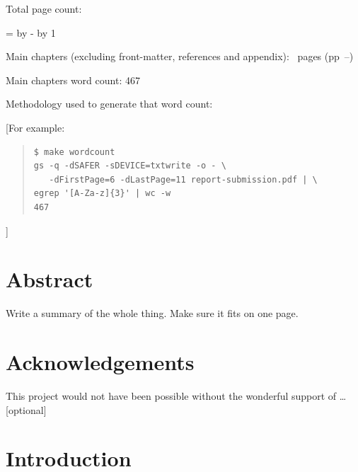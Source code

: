 \documentclass[12pt,a4paper,twoside]{report}
\newif\ifsubmission %
\begin{document}
\begin{sffamily}
Total page count: \pageref{lastpage}

\makeatletter
\@tempcnta=\relax%
\advance\@tempcnta by -%
\advance\@tempcnta by 1%
\xdef\contentpages{\the\@tempcnta}%
\makeatother

Main chapters (excluding front-matter, references and appendix):
\contentpages~pages
(pp~\pageref{firstcontentpage}--\pageref{lastcontentpage})

Main chapters word count: 467

Methodology used to generate that word count:

[For example:

\begin{quote}
\begin{verbatim}
$ make wordcount
gs -q -dSAFER -sDEVICE=txtwrite -o - \
   -dFirstPage=6 -dLastPage=11 report-submission.pdf | \
egrep '[A-Za-z]{3}' | wc -w
467
\end{verbatim}
\end{quote}

]

\end{sffamily}

\onehalfspacing

\chapter*{Abstract}

Write a summary of the whole thing. Make sure it fits on one page.

\ifsubmission\else

\chapter*{Acknowledgements}

This project would not have been possible without the wonderful
support of \ldots [optional]

\fi
\cleardoublepage %

\tableofcontents

\chapter{Introduction}
\end{document}
